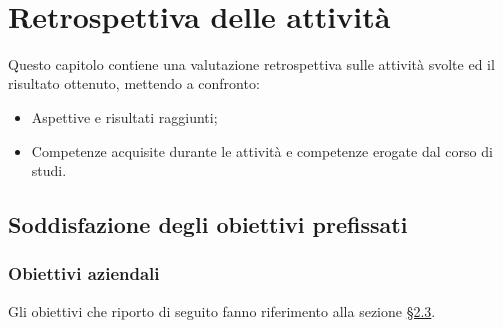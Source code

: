 \newpage \ \thispagestyle{empty} \newpage
\chapter{Retrospettiva delle attività}
\label{cap:resoconto}
Questo capitolo contiene una valutazione retrospettiva sulle attività svolte ed il risultato ottenuto, mettendo a confronto:
\begin{itemize}
    \item Aspettive e risultati raggiunti;
    \item Competenze acquisite durante le attività e competenze erogate dal corso di studi.
\end{itemize}

\section{Soddisfazione degli obiettivi prefissati}

\subsection{Obiettivi aziendali}
Gli obiettivi che riporto di seguito fanno riferimento alla sezione \hyperref[sec:obiettivi-aziendali]{§2.3}.
